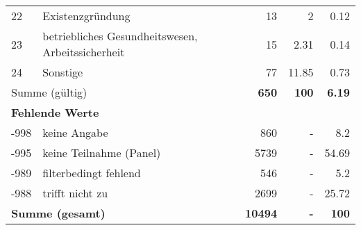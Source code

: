 \begin{longtable}{lXrrr}
        22 & \multicolumn{1}{X}{Existenzgründung} & %
          \num{13} &
          \num[round-mode=places,round-precision=2]{2} &
          \num[round-mode=places,round-precision=2]{0.12} \\

        23 & \multicolumn{1}{X}{betriebliches Gesundheitswesen, Arbeitssicherheit} & %
          \num{15} &
          \num[round-mode=places,round-precision=2]{2.31} &
          \num[round-mode=places,round-precision=2]{0.14} \\

        24 & \multicolumn{1}{X}{Sonstige} & %
          \num{77} &
          \num[round-mode=places,round-precision=2]{11.85} &
          \num[round-mode=places,round-precision=2]{0.73} \\

     \midrule
     \multicolumn{2}{l}{Summe (gültig)} &
       \textbf{\num{650}} &
     \textbf{\num{100}} &
       \textbf{\num[round-mode=places,round-precision=2]{6.19}} \\
     \multicolumn{5}{l}{\textbf{Fehlende Werte}}\\
       -998 &
       keine Angabe &
         \num{860} &
        - &
         \num[round-mode=places,round-precision=2]{8.2} \\
       -995 &
       keine Teilnahme (Panel) &
         \num{5739} &
        - &
         \num[round-mode=places,round-precision=2]{54.69} \\
       -989 &
       filterbedingt fehlend &
         \num{546} &
        - &
         \num[round-mode=places,round-precision=2]{5.2} \\
       -988 &
       trifft nicht zu &
         \num{2699} &
        - &
         \num[round-mode=places,round-precision=2]{25.72} \\
     \midrule
     \multicolumn{2}{l}{\textbf{Summe (gesamt)}} &
          \textbf{\num{10494}} &
        \textbf{-} &
        \textbf{\num{100}} \\
     \bottomrule
     \end{longtable}
     
